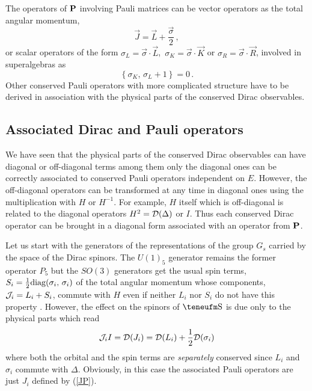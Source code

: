 \documentclass[a4paper,12pt]{article}
\begin{document}
The operators of ${\bf P}$ involving Pauli matrices can be vector 
operators as the total angular momentum, 
\begin{equation}\label{JP}
\vec{J} =\vec{L}+\frac{\vec{\sigma}}{2}\,,
\end{equation}
or scalar operators of the form $\sigma_L =\vec{\sigma}\cdot\vec{L}$,\,
$\sigma_K =\vec{\sigma}\cdot\vec{K}$ or  
$\sigma_R =\vec{\sigma}\cdot\vec{R}$,
involved in superalgebras as
\begin{equation}\label{sksl} 
\left\{\sigma_{K},\,\sigma_{L}+1\right\}=0\,.
\end{equation}
Other conserved Pauli operators with more complicated structure have 
to be derived in association with the physical parts of the conserved 
Dirac observables. 
 
\subsection{Associated Dirac and Pauli operators}

We have seen that the physical parts of the conserved Dirac observables 
can have diagonal or off-diagonal terms among them only the diagonal 
ones can be correctly associated to  conserved Pauli operators independent 
on $E$.  However, the off-diagonal operators can be transformed at any 
time in diagonal ones using the multiplication with $H$ or $H^{-1}$. 
For example,  $H$ itself which is off-diagonal is related to the diagonal 
operators $H^2={\cal D}(\Delta)$ or  $I$. Thus each conserved Dirac 
operator can be brought in a diagonal form  associated with an operator 
from ${\bf P}$. 

Let us start with the generators of the representations of the group 
$G_{s}$ carried by the space of the Dirac spinors. The $U(1)_{5}$ 
generator remains the former  operator $P_{5}$ but the $SO(3)$ generators 
get  the usual spin terms, 
$S_{i}=\frac{1}{2}{\rm diag}(\sigma_{i},\,\sigma_{i})$ of the total 
angular momentum whose components, ${\cal J}_{i}=L_{i} +S_{i}$, 
commute with $H$ even if neither $L_{i}$ nor $S_{i}$ do not have this 
property \cite{CV2,CV4}. However, the effect on the spinors of $\Eh$ 
is due only to the physical parts which read 
\begin{equation}\label{JI}
{\cal J}_{i}I= {\cal D}(J_{i})={\cal D}(L_{i}) + \frac{1}{2}
{\cal D}(\sigma_{i})
\end{equation}
where both the orbital and the spin terms are {\em separately} conserved 
since $L_{i}$ and $\sigma_{i}$ commute with $\Delta$. Obviously, in this 
case the associated Pauli operators are just $J_i$ defined by (\ref{JP}). 
\end{document}
